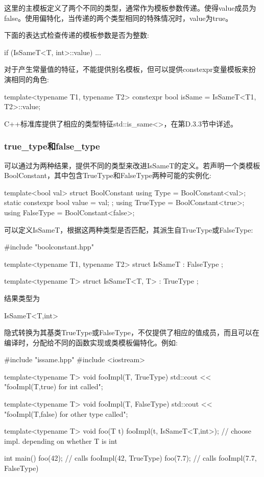 这里的主模板定义了两个不同的类型，通常作为模板参数传递。使得value成员为false。使用偏特化，当传递的两个类型相同的特殊情况时，value为true。

下面的表达式检查传递的模板参数是否为整数:

\begin{cpp}
if (IsSameT<T, int>::value) ...
\end{cpp}

对于产生常量值的特征，不能提供别名模板，但可以提供constexpr变量模板来扮演相同的角色:

\begin{cpp}
template<typename T1, typename T2>
constexpr bool isSame = IsSameT<T1, T2>::value;
\end{cpp}

C++标准库提供了相应的类型特征std::is\_same<>，在第D.3.3节中详述。

\subsubsection{true\_type和false\_type}

可以通过为两种结果，提供不同的类型来改进IsSameT的定义。若声明一个类模板BoolConstant，其中包含TrueType和FalseType两种可能的实例化:

\begin{cpp}
template<bool val>
struct BoolConstant {
	using Type = BoolConstant<val>;
	static constexpr bool value = val;
};
using TrueType = BoolConstant<true>;
using FalseType = BoolConstant<false>;
\end{cpp}

可以定义IsSameT，根据这两种类型是否匹配，其派生自TrueType或FalseType:

\begin{cpp}
#include "boolconstant.hpp"

template<typename T1, typename T2>
struct IsSameT : FalseType
{
};

template<typename T>
struct IsSameT<T, T> : TrueType
{
};
\end{cpp}

结果类型为

\begin{cpp}
IsSameT<T,int>
\end{cpp}

隐式转换为其基类TrueType或FalseType，不仅提供了相应的值成员，而且可以在编译时，分配给不同的函数实现或类模板偏特化。例如:

\begin{cpp}
#include "issame.hpp"
#include <iostream>

template<typename T>
void fooImpl(T, TrueType)
{
	std::cout << "fooImpl(T,true) for int called\n";
}

template<typename T>
void fooImpl(T, FalseType)
{
	std::cout << "fooImpl(T,false) for other type called\n";
}

template<typename T>
void foo(T t)
{
	fooImpl(t, IsSameT<T,int>{}); // choose impl. depending on whether T is int
}

int main()
{
	foo(42); // calls fooImpl(42, TrueType)
	foo(7.7); // calls fooImpl(7.7, FalseType)
}
\end{cpp}

